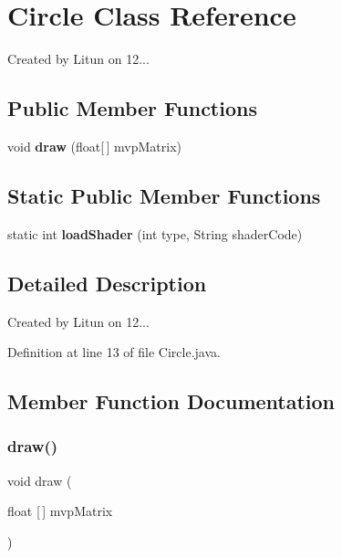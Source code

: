 \section{Circle Class Reference}
\label{classru_1_1litun_1_1unitingtwist_1_1_circle}


Created by Litun on 12...  


\subsection*{Public Member Functions}
\begin{DoxyCompactItemize}
\item 
void \textbf{ draw} (float[$\,$] mvp\+Matrix)
\end{DoxyCompactItemize}
\subsection*{Static Public Member Functions}
\begin{DoxyCompactItemize}
\item 
static int \textbf{ load\+Shader} (int type, String shader\+Code)
\end{DoxyCompactItemize}


\subsection{Detailed Description}
Created by Litun on 12... 

Definition at line 13 of file Circle.\+java.



\subsection{Member Function Documentation}
\mbox{\label{classru_1_1litun_1_1unitingtwist_1_1_circle_ace8a0d2a4e41b6d83897d48fd91a7ab3}} 
\subsubsection{draw()}
{\footnotesize\ttfamily void draw (\begin{DoxyParamCaption}\item[{float [$\,$]}]{mvp\+Matrix }\end{DoxyParamCaption})}



